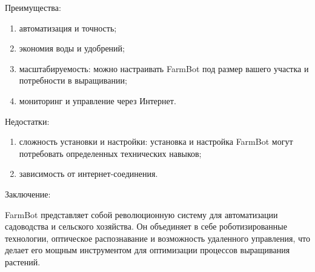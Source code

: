 Преимущества:

\begin{enumerate}
    \item автоматизация и точность;
    \item экономия воды и удобрений;
    \item масштабируемость: можно настраивать FarmBot под размер вашего участка и потребности в выращивании;
    \item мониторинг и управление через Интернет.
\end{enumerate}

Недостатки:

\begin{enumerate}
    \item сложность установки и настройки: установка и настройка FarmBot могут потребовать определенных технических навыков;
    \item зависимость от интернет-соединения.
\end{enumerate}

Заключение:

FarmBot представляет собой революционную систему для автоматизации садоводства и сельского хозяйства. Он объединяет в себе роботизированные технологии, оптическое распознавание и возможность удаленного управления, что делает его мощным инструментом для оптимизации процессов выращивания растений. 